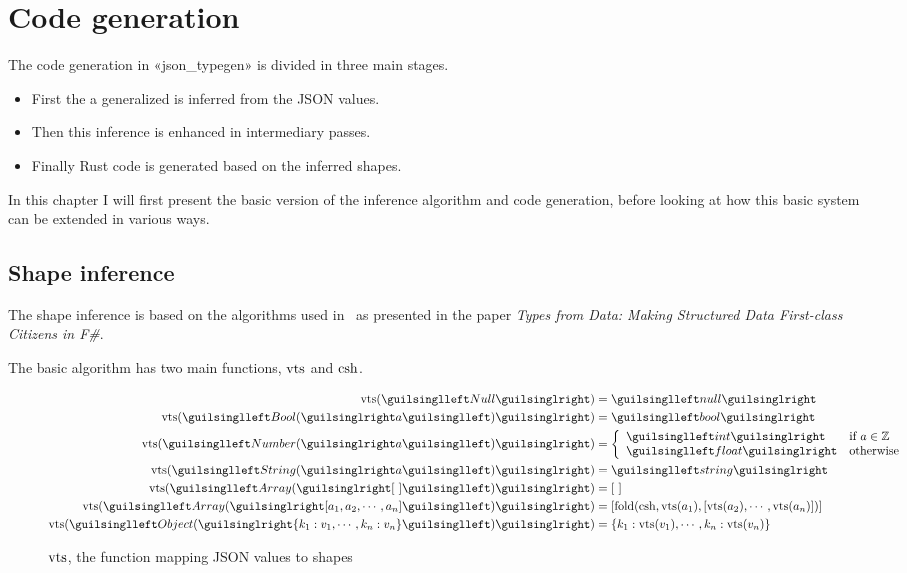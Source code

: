 
\chapter{Code generation}

The code generation in «json_typegen» is divided in three main stages.

\begin{itemize}
  \item First the a generalized  is inferred from the JSON values.
  \item Then this inference is enhanced in intermediary passes.
  \item Finally Rust code is generated based on the inferred shapes.
\end{itemize}

In this chapter I will first present the basic version of the inference algorithm and code generation, before looking at how this basic system can be extended in various ways.

\section{Shape inference}

The shape inference is based on the algorithms used in \fsharpdata\ as presented in the paper \emph{Types from Data: Making Structured Data First-class Citizens in F\#}\cite{fsharp-types-from-data}.

The basic algorithm has two main functions, $\operatorname{vts}$ and $\operatorname{csh}$.

\begin{figure}[ht!]
\begin{align*}
\shap(‹Null›)          &= ‹null› \\
\shap(‹Bool(›a‹)›)     &= ‹bool› \\
\shap(‹Number(›a‹)›)   &= \left\{\begin{array}{ll}
  ‹int›   & \text{if } a \in \mathbb{Z} \\
  ‹float› & \text{otherwise}
\end{array}\right.\\
\shap(‹String(›a‹)›)   &= ‹string› \\
\shap(‹Array(›[\ ]‹)›) &= [\ ] \\
\shap(‹Array(›[a_1, a_2, \cdots, a_n]‹)›) &= [\fold(\csh, \shap(a_1), [\shap(a_2), \cdots, \shap(a_n)])] \\
\shap(‹Object(›\{ k_1 : v_1, \cdots, k_n : v_n \}‹)›) &= \{ k_1 : \shap(v_1), \cdots, k_n : \shap(v_n) \}
\end{align*}
\caption{$\operatorname{vts}$, the function mapping JSON values to shapes}
\label{fig:shap}
\end{figure}

